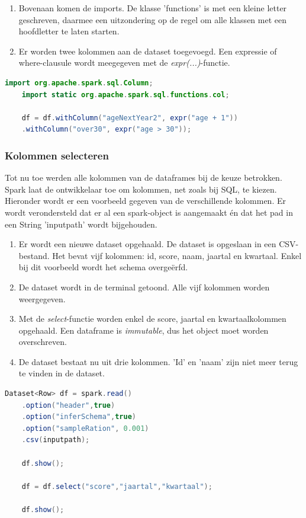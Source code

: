 \documentclass[a4paper,10pt,twoside]{report}
\begin{document}
\begin{enumerate}
	\item Bovenaan komen de imports. De klasse 'functions' is met een kleine letter geschreven, daarmee een uitzondering op de regel om alle klassen met een hoofdletter te laten starten.
	\item Er worden twee kolommen aan de dataset toegevoegd. Een expressie of where-clausule wordt meegegeven met de \textit{expr(...)}-functie.
\end{enumerate}

\begin{lstlisting}[language=Java]
	import org.apache.spark.sql.Column;
	import static org.apache.spark.sql.functions.col;
	
	df = df.withColumn("ageNextYear2", expr("age + 1"))
	.withColumn("over30", expr("age > 30"));
\end{lstlisting}

\subsubsection{Kolommen selecteren}
Tot nu toe werden alle kolommen van de dataframes bij de keuze betrokken. Spark laat de ontwikkelaar toe om kolommen, net zoals bij SQL, te kiezen. Hieronder wordt er een voorbeeld gegeven van de verschillende kolommen. Er wordt verondersteld dat er al een spark-object is aangemaakt én dat het pad in een String 'inputpath' wordt bijgehouden.

\begin{enumerate}
	\item Er wordt een nieuwe dataset opgehaald. De dataset is opgeslaan in een CSV-bestand. Het bevat vijf kolommen: id, score, naam, jaartal en kwartaal. Enkel bij dit voorbeeld wordt het schema overgeërfd. 
	\item De dataset wordt in de terminal getoond. Alle vijf kolommen worden weergegeven.
	\item Met de \textit{select}-functie worden enkel de score, jaartal en kwartaalkolommen opgehaald. Een dataframe is \textit{immutable}, dus het object moet worden overschreven.
	\item De dataset bestaat nu uit drie kolommen. 'Id' en 'naam' zijn niet meer terug te vinden in de dataset.
\end{enumerate}

\begin{lstlisting}[language=Java]
	Dataset<Row> df = spark.read()
	.option("header",true)
	.option("inferSchema",true)
	.option("sampleRation", 0.001)
	.csv(inputpath);
	
	df.show();
	
	df = df.select("score","jaartal","kwartaal");
	
	df.show();
\end{lstlisting}
\end{document}
